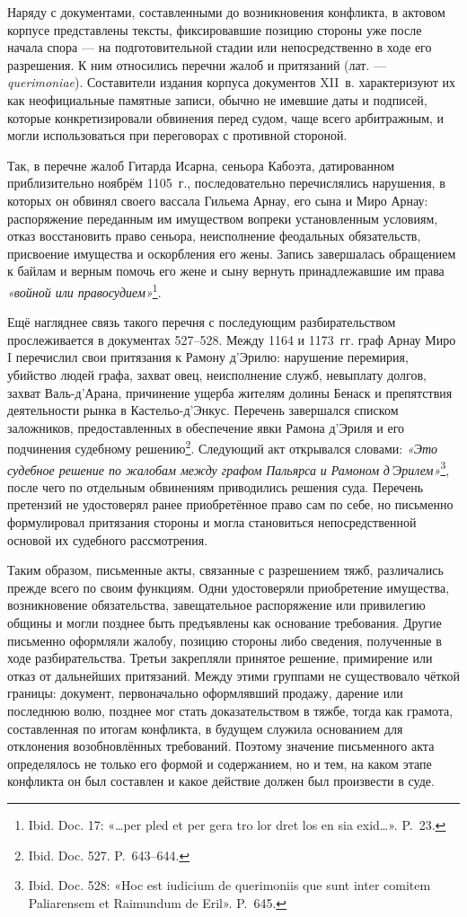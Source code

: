 Наряду с документами, составленными до возникновения конфликта, в актовом корпусе представлены тексты, фиксировавшие позицию стороны уже после начала спора --- на подготовительной стадии или непосредственно в ходе его разрешения. К ним относились перечни жалоб и притязаний (лат. --- \emph{querimoniae}). Составители издания корпуса документов XII~в. характеризуют их как неофициальные памятные записи, обычно не имевшие даты и подписей, которые конкретизировали обвинения перед судом, чаще всего арбитражным, и могли использоваться при переговорах с противной стороной.

Так, в перечне жалоб Гитарда Исарна, сеньора Кабоэта, датированном приблизительно ноябрём 1105~г., последовательно перечислялись нарушения, в которых он обвинял своего вассала Гильема Арнау, его сына и Миро Арнау: распоряжение переданным им имуществом вопреки установленным условиям, отказ восстановить право сеньора, неисполнение феодальных обязательств, присвоение имущества и оскорбления его жены. Запись завершалась обращением к байлам и верным помочь его жене и сыну вернуть принадлежавшие им права \emph{«войной или правосудием»}\footnote{Ibid. Doc. 17: «…per pled et per gera tro lor dret los en sia exid…». P.~23.}.

Ещё нагляднее связь такого перечня с последующим разбирательством прослеживается в документах 527--528. Между 1164 и 1173~гг. граф Арнау Миро I перечислил свои притязания к Рамону д’Эрилю: нарушение перемирия, убийство людей графа, захват овец, неисполнение служб, невыплату долгов, захват Валь-д’Арана, причинение ущерба жителям долины Бенаск и препятствия деятельности рынка в Кастельо-д’Энкус. Перечень завершался списком заложников, предоставленных в обеспечение явки Рамона д’Эриля и его подчинения судебному решению\footnote{Ibid. Doc. 527. P.~643--644.}. Следующий акт открывался словами: \emph{«Это судебное решение по жалобам между графом }\emph{Пальярса}\emph{ и Рамоном }\emph{д’Эрилем}\emph{»}\footnote{Ibid. Doc. 528: «Hoc est iudicium de querimoniis que sunt inter comitem Paliarensem et Raimundum de Eril». P.~645.}, после чего по отдельным обвинениям приводились решения суда. Перечень претензий не удостоверял ранее приобретённое право сам по себе, но письменно формулировал притязания стороны и могла становиться непосредственной основой их судебного рассмотрения.

Таким образом, письменные акты, связанные с разрешением тяжб, различались прежде всего по своим функциям. Одни удостоверяли приобретение имущества, возникновение обязательства, завещательное распоряжение или привилегию общины и могли позднее быть предъявлены как основание требования. Другие письменно оформляли жалобу, позицию стороны либо сведения, полученные в ходе разбирательства. Третьи закрепляли принятое решение, примирение или отказ от дальнейших притязаний. Между этими группами не существовало чёткой границы: документ, первоначально оформлявший продажу, дарение или последнюю волю, позднее мог стать доказательством в тяжбе, тогда как грамота, составленная по итогам конфликта, в будущем служила основанием для отклонения возобновлённых требований. Поэтому значение письменного акта определялось не только его формой и содержанием, но и тем, на каком этапе конфликта он был составлен и какое действие должен был произвести в суде.

